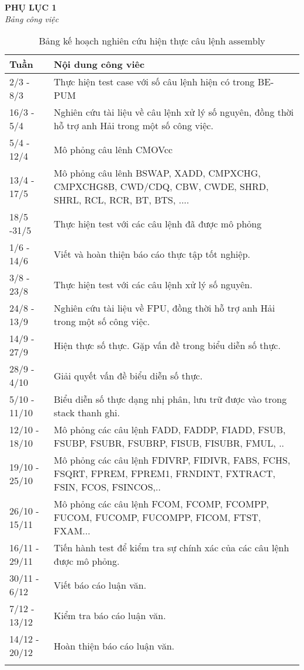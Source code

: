 \begin{center}
	\begin{huge}
			\textbf{PHỤ LỤC 1}\\
			\textit{Bảng công việc}
	\end{huge}
\end{center}

	\begin{longtable}{|l|m{13cm}|}
		\hline
			Tuần & Nội dung công viêc \\
		\hline
		\hline
			2/3 - 8/3	& Thực hiện test case với số câu lệnh hiện có trong BE-PUM\\
		\hline	
			16/3 - 5/4&	Nghiên cứu tài liệu về câu lệnh xử lý số nguyên, đồng thời hỗ trợ anh Hải trong một số công việc.\\
		\hline	
			5/4 - 12/4&	Mô phỏng câu lênh CMOVcc\\
		\hline	
			13/4 - 17/5	&Mô phỏng câu lênh  BSWAP, XADD, CMPXCHG, CMPXCHG8B, CWD/CDQ, CBW, CWDE, SHRD, SHRL, RCL, RCR,  BT, BTS, ....\\		
		\hline	
			18/5 -31/5	&Thực hiện test với các câu lệnh đã được mô phỏng\\
		\hline	
			1/6 - 14/6	&Viết  và hoàn thiện báo cáo  thực tập tốt nghiệp.\\	
		\hline	
			3/8 - 23/8&	Thực hiện test với các câu lệnh xử lý số nguyên.\\
		\hline	
			24/8 - 13/9&	Nghiên cứu tài liệu về FPU, đồng thời hỗ trợ anh Hải trong một số công việc.\\
		\hline	
			14/9 - 27/9	&Hiện thực số thực. Gặp vấn đề trong biểu diễn số thực.\\
		\hline	
			28/9 - 4/10&	Giải quyết vấn đề biểu diễn số thực.\\
		\hline	
			5/10 - 11/10&	Biểu diễn số thực dạng nhị phân, lưu trữ được vào trong stack thanh ghi.\\
		\hline	
			12/10 - 18/10&	Mô phỏng các câu lệnh FADD, FADDP, FIADD, FSUB, FSUBP, FSUBR, FSUBRP, FISUB, FISUBR, FMUL, ..\\
		\hline	
			19/10 - 25/10&	Mô phỏng các câu lệnh  FDIVRP, FIDIVR, FABS, FCHS, FSQRT, FPREM, FPREM1, FRNDINT, FXTRACT, FSIN, FCOS, FSINCOS,..\\
		\hline
			26/10 - 15/11	&Mô phỏng các câu lệnh FCOM, FCOMP, FCOMPP, FUCOM, FUCOMP, FUCOMPP, FICOM,  FTST, FXAM...\\		
		\hline	
			16/11 - 29/11&	Tiến hành test để kiểm tra sự chính xác của các câu lệnh được mô phỏng.\\
		\hline	
			30/11 - 6/12	&Viết báo cáo luận văn.\\
		\hline	
			7/12 - 13/12	&Kiểm tra báo cáo luận văn.\\
		\hline	
			14/12 - 20/12&	Hoàn thiện báo cáo luận văn.\\
		\hline
			\caption{Bảng kế hoạch nghiên cứu hiện thực câu lệnh assembly}
	\end{longtable}